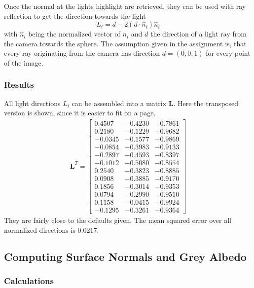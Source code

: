 \documentclass{paper}
\begin{document}
Once the normal at the lights highlight are retrieved, they can be used with ray reflection to get the direction towards the light
\begin{equation}
	L_i = d - 2(d\cdot \hat{n}_i)\hat{n}_i
\end{equation}
with $\hat{n}_i$ being the normalized vector of $n_i$ and $d$ the direction of a light ray from the camera towards the sphere.
The assumption given in the assignment is, 
that every ray originating from the camera has direction $d = (0,0,1)$ for every point of the image.

\subsubsection{Results}
All light directions $L_i$ can be assembled into a matrix $\mathbf{L}$. Here the
transposed version is shown, since it is easier to fit on a page.
\begin{align*}
\mathbf{L}^T= 
\left[ 
\begin{array}{cccccccccccccc}
0.4507 & -0.4230 & -0.7861 \\ 0.2180 & -0.1229 & -0.9682 \\ -0.0345 & -0.1577 & -0.9869 \\ -0.0854 & -0.3983 & -0.9133 \\ -0.2897 & -0.4593 & -0.8397 \\ -0.1012 & -0.5080 & -0.8554 \\ 0.2540 & -0.3823 & -0.8885 \\ 0.0908 & -0.3885 & -0.9170 \\ 0.1856 & -0.3014 & -0.9353 \\ 0.0794 & -0.2990 & -0.9510 \\ 0.1158 & -0.0415 & -0.9924 \\ -0.1295 & -0.3261 & -0.9364 
\end{array} 
\right] 
\end{align*}
They are fairly close to the defaults given. The mean squared error over all normalized directions is 0.0217.

\subsection{Computing Surface Normals and Grey Albedo}

\subsubsection{Calculations}
\end{document}
